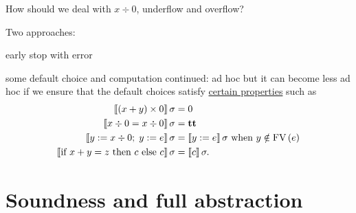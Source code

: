 \begin{enumcirc}
	\item
	How should we deal with $x \div 0$, underflow and overflow?
	\item
	Two approaches:
	\begin{enumrm}
		\item
		early stop with error
		\item
		some default choice and computation continued:
		ad hoc but it can become less ad hoc if we ensure that the default choices
		satisfy \ul{certain properties} such as
		\begin{align*}
			\left\llbracket \left( x + y \right) \times 0 \right\rrbracket \sigma                       & = 0                     \\
			\left\llbracket x \div 0 = x \div 0 \right\rrbracket \sigma                          & = \textbf{tt}                  \\
			\left\llbracket y := x \div 0 ;\; y := e \right\rrbracket \sigma & =
			\left\llbracket y := e \right\rrbracket \sigma \textrm{ when } y \notin \textrm{FV}\left(  e  \right)                         \\
			\left\llbracket \textrm{if } x + y = z \textrm{ then } c \textrm{ else } c \right\rrbracket \sigma                        & = \left\llbracket c \right\rrbracket \sigma. \\
		\end{align*}
	\end{enumrm}
\end{enumcirc}

\section{Soundness and full abstraction}

